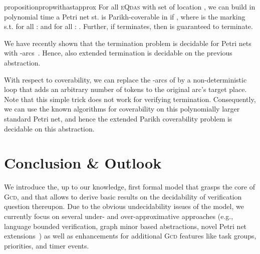 \documentclass[runningheads,oribibl,]{article}
\renewcommand{\gcd}{\textsc{Gcd}\xspace}
\newcommand{\eqdas}{\textsc{eQdas}\xspace}
\begin{document}
\begin{restatable}{proposition}{propwithastapprox}
  \label{prop:withastapprox}
  For all \eqdas with set of location , we can build
  in polynomial time a Petri net  st.  is
  Parikh-coverable in  if , where  is the
  marking s.t. for all :  and for all : . Further, if  terminates,
  then  is guaranteed to terminate.
\end{restatable}

We have recently shown that the termination problem is decidable for
Petri nets with -arcs~\cite{geeraerts-g-2012--a}.
Hence, also  extended termination is decidable on the previous
abstraction.

With respect to coverability, we can replace the -arcs of
 by a non-deterministic loop that adds an arbitrary
number of tokens to the original arc's target place. Note that this
simple trick does not work for verifying termination. Consequently,
we can use the known algorithms for coverability on this polynomially
larger standard Petri net, and hence  the extended Parikh
coverability problem is decidable on this abstraction.



















\section{Conclusion \& Outlook}
We introduce the, up to our knowledge, first formal model that grasps
the core of \gcd, and that allows to derive basic results on the
decidability of verification question thereupon. Due to the obvious
undecidability issues of the model, we currently focus on several
under- and over-approximative approaches (e.g., language bounded
verification, graph minor based abstractions, novel Petri net
extensions~\cite{geeraerts-g-2012--a}) as well as enhancements for
additional \gcd features like task groups, priorities, and timer
events.
\end{document}
